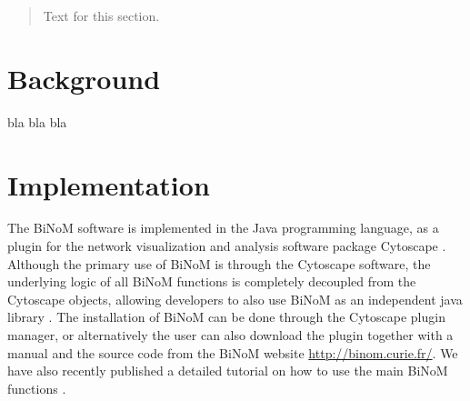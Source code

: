 \documentclass[10pt]{bmc_article}
\newenvironment{bmcformat}{\baselineskip20pt\sloppy\setboolean{publ}{false}}{\baselineskip20pt\sloppy}
\begin{document}
\begin{bmcformat}
\begin{abstract}
%
%        
Text for this section.

        
\end{abstract}











\section*{Background}
%
%
bla bla bla


\section*{Implementation}
The BiNoM software is implemented in the Java programming language, as a plugin
for the network visualization and analysis software package Cytoscape
\cite{cline2007integration}. Although the primary use of BiNoM is through the
Cytoscape software, the underlying logic of all BiNoM functions is completely
decoupled from the Cytoscape objects, allowing developers to also use BiNoM as
an independent java library \cite{zinovyev2008binom}. The installation of BiNoM
can be done through the Cytoscape plugin manager, or alternatively the user can
also download
the plugin together with a manual and the source code from the BiNoM website
\url{http://binom.curie.fr/}. We have also recently published a 
detailed tutorial on how to use the main BiNoM functions \cite{binomBookChapter}.


\end{bmcformat}
\end{document}
